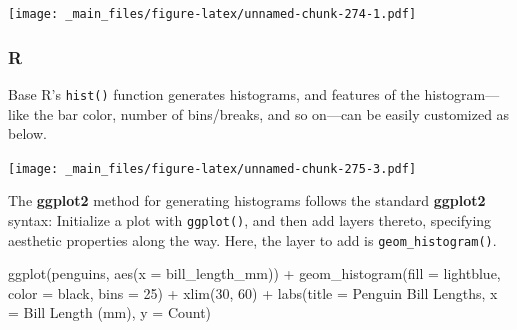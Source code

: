 \documentclass[
]{book}
\newenvironment{Shaded}{\begin{snugshade}}{\end{snugshade}}
\newcommand{\AttributeTok}[1]{\textcolor[rgb]{0.77,0.63,0.00}{#1}}
\newcommand{\DecValTok}[1]{\textcolor[rgb]{0.00,0.00,0.81}{#1}}
\newcommand{\FunctionTok}[1]{\textcolor[rgb]{0.00,0.00,0.00}{#1}}
\newcommand{\NormalTok}[1]{#1}
\newcommand{\SpecialCharTok}[1]{\textcolor[rgb]{0.00,0.00,0.00}{#1}}
\newcommand{\StringTok}[1]{\textcolor[rgb]{0.31,0.60,0.02}{#1}}
\begin{document}
\texttt{[image: \_main\_files/figure-latex/unnamed-chunk-274-1.pdf]}

\hypertarget{r-41}{%
\subsubsection*{R}\label{r-41}}

Base R's \texttt{hist()} function generates histograms, and features of the histogram---like the bar color, number of bins/breaks, and so on---can be easily customized as below.

\begin{Shaded}
\end{Shaded}

\texttt{[image: \_main\_files/figure-latex/unnamed-chunk-275-3.pdf]}

The \textbf{ggplot2} method for generating histograms follows the standard \textbf{ggplot2} syntax: Initialize a plot with \texttt{ggplot()}, and then add layers thereto, specifying aesthetic properties along the way. Here, the layer to add is \texttt{geom\_histogram()}.

\begin{Shaded}
\begin{Highlighting}[]
\FunctionTok{ggplot}\NormalTok{(penguins, }\FunctionTok{aes}\NormalTok{(}\AttributeTok{x =}\NormalTok{ bill\_length\_mm)) }\SpecialCharTok{+}
  \FunctionTok{geom\_histogram}\NormalTok{(}\AttributeTok{fill =} \StringTok{\textquotesingle{}lightblue\textquotesingle{}}\NormalTok{, }\AttributeTok{color =} \StringTok{\textquotesingle{}black\textquotesingle{}}\NormalTok{, }\AttributeTok{bins =} \DecValTok{25}\NormalTok{) }\SpecialCharTok{+}
  \FunctionTok{xlim}\NormalTok{(}\DecValTok{30}\NormalTok{, }\DecValTok{60}\NormalTok{) }\SpecialCharTok{+} \FunctionTok{labs}\NormalTok{(}\AttributeTok{title =} \StringTok{\textquotesingle{}Penguin Bill Lengths\textquotesingle{}}\NormalTok{, }\AttributeTok{x =} \StringTok{\textquotesingle{}Bill Length (mm)\textquotesingle{}}\NormalTok{, }\AttributeTok{y =} \StringTok{\textquotesingle{}Count\textquotesingle{}}\NormalTok{)}
\end{Highlighting}
\end{Shaded}
\end{document}
